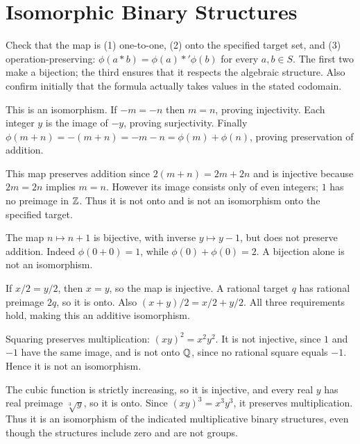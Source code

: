 \section{Isomorphic Binary Structures}


Check that the map is (1) one-to-one, (2) onto the specified target set, and (3) operation-preserving: $\phi(a*b)=\phi(a)*'\phi(b)$ for every $a,b\in S$. The first two make a bijection; the third ensures that it respects the algebraic structure. Also confirm initially that the formula actually takes values in the stated codomain.


This is an isomorphism. If $-m=-n$ then $m=n$, proving injectivity. Each integer $y$ is the image of $-y$, proving surjectivity. Finally $\phi(m+n)=-(m+n)=-m-n=\phi(m)+\phi(n)$, proving preservation of addition.


This map preserves addition since $2(m+n)=2m+2n$ and is injective because $2m=2n$ implies $m=n$. However its image consists only of even integers; $1$ has no preimage in $\mathbb{Z}$. Thus it is not onto and is not an isomorphism onto the specified target.


The map $n\mapsto n+1$ is bijective, with inverse $y\mapsto y-1$, but does not preserve addition. Indeed $\phi(0+0)=1$, while $\phi(0)+\phi(0)=2$. A bijection alone is not an isomorphism.


If $x/2=y/2$, then $x=y$, so the map is injective. A rational target $q$ has rational preimage $2q$, so it is onto. Also $(x+y)/2=x/2+y/2$. All three requirements hold, making this an additive isomorphism.


Squaring preserves multiplication: $(xy)^2=x^2y^2$. It is not injective, since $1$ and $-1$ have the same image, and is not onto $\mathbb{Q}$, since no rational square equals $-1$. Hence it is not an isomorphism.


The cubic function is strictly increasing, so it is injective, and every real $y$ has real preimage $\sqrt[3]{y}$, so it is onto. Since $(xy)^3=x^3y^3$, it preserves multiplication. Thus it is an isomorphism of the indicated multiplicative binary structures, even though the structures include zero and are not groups.

